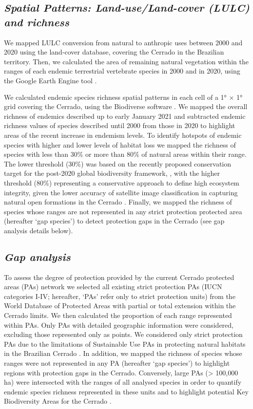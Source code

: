 \documentclass[12pt,openright,oneside,a4paper,english]{abntex2}
\begin{document}
\subsection{\textit{Spatial Patterns: Land-use/Land-cover (LULC) and richness}}

We mapped LULC conversion from natural to anthropic uses between 2000 and 2020 using the \citet{MapBiomas2022} land-cover database, covering the Cerrado in the Brazilian territory. Then, we calculated the area of remaining natural vegetation within the ranges of each endemic terrestrial vertebrate species in 2000 and in 2020, using the Google Earth Engine tool \citep{GEE}.

We calculated endemic species richness spatial patterns in each cell of a 1° × 1° grid covering the Cerrado, using the Biodiverse software \citep{Laffan2010}. We mapped the overall richness of endemics described up to early January 2021 and subtracted endemic richness values of species described until 2000 from those in 2020 to highlight areas of the recent increase in endemism levels. To identify hotspots of endemic species with higher and lower levels of habitat loss we mapped the richness of species with less than 30\% or more than 80\% of natural areas within their range. The lower threshold (30\%) was based on the recently proposed conservation target for the post-2020 global biodiversity framework, \citep{Woodley2019}, with the higher threshold (80\%) representing a conservative approach to define high ecosystem integrity, given the lower accuracy of satellite image classification in capturing natural open formations in the Cerrado \citep{Alencar2020}. Finally, we mapped the richness of species whose ranges are not represented in any strict protection protected area (hereafter ‘gap species’) to detect protection gaps in the Cerrado (see gap analysis details below).

\subsection{\textit{Gap analysis}}

To assess the degree of protection provided by the current Cerrado protected areas (PAs) network we selected all existing strict protection PAs (IUCN categories I-IV; hereafter, ‘PAs’ refer only to strict protection units) from the World Database of Protected Areas \citep{UNEP-IUCN-PAs} with partial or total extension within the Cerrado limits. We then calculated the proportion of each range represented within PAs. Only PAs with detailed geographic information were considered, excluding those represented only as points. We considered only strict protection PAs due to the limitations of Sustainable Use PAs in protecting natural habitats in the Brazilian Cerrado \citep{Francoso2015}. In addition, we mapped the richness of species whose ranges were not represented in any PA (hereafter ‘gap species’) to highlight regions with protection gaps in the Cerrado. Conversely, large PAs (> 100,000 ha) were intersected with the ranges of all analysed species in order to quantify endemic species richness represented in these units and to highlight potential Key Biodiversity Areas for the Cerrado \citep{KBAs2022}.
\end{document}
